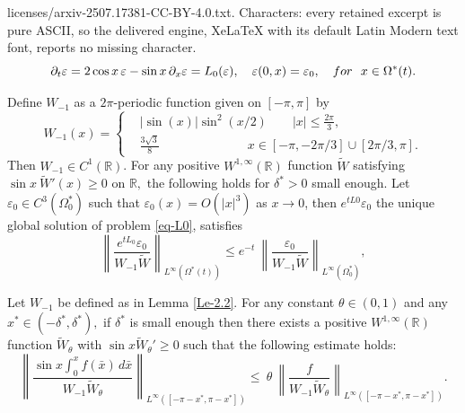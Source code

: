 \documentclass[10pt,a4paper]{amsart}
\def\R{{\mathbb R}}
\let\veps=\varepsilon
\begin{document}
licenses/arxiv-2507.17381-CC-BY-4.0.txt. Characters: every retained excerpt is pure ASCII, so the delivered engine, XeLaTeX with its default Latin Modern text font, reports no missing character.
\begin{equation}\label{eq-L0}
\partial_t \veps = 2 \cos x \,\veps-\sin x\, \partial_x \veps=L_0 (\veps), \quad \veps(0, x)=\veps_0,\quad {\rm for}~~x\in \Omega^*(t).
 \end{equation}

 \begin{lem}\label{Le-2.2}
 Define $W_{-1}$ as a $2\pi$-periodic function given on $[-\pi, \pi]$ by 
\begin{equation}
{W}_{-1} (x)=\left\{\begin{aligned}
 &|\sin(x) |\sin^2(x/2)\qquad |x|\leq \frac{2\pi}{3},\\
 &\frac{3\sqrt{3}}{8}\qquad\qquad\qquad \quad  x\in [-\pi, - {2\pi}/{3}]\cup [{2\pi}/{3},  \pi].
 \end{aligned}\right.
\end{equation}
Then $W_{-1}\in C^1(\mathbb R)$. For any positive  $W^{1, \infty}(\R)$  function $\widetilde W$ satisfying $\sin x ~{\widetilde W}'(x)\geq 0$ on $\R,$ the 
following holds for $\delta^*>0$ small enough. Let $\veps_0\in  C^{3}(\Omega^*_0)$ such that $\veps_0(x)=O(|x|^{3})$ as $x\to 0$, then $e^{tL0}\veps_0$ the unique global solution of problem \eqref{eq-L0}, satisfies 
\begin{equation}\label{Le2.2-2}
\left\|\frac{e^{tL_0} \veps_0}{W_{-1} \widetilde W}\right\|_{L^\infty{(\Omega^*(t))}}\leq  e^{-t}~
 \left\|\frac{\veps_0}{W_{-1}\widetilde W}\right\|_{L^\infty{(\Omega^*_0)}},\end{equation}
  \end{lem}

 \begin{lem}\label{Le-2.3}
 Let $W_{-1}$ be defined as in Lemma \ref{Le-2.2}.     For any   constant $\theta\in(0, 1)$ and  any  $x^*  \in (-\delta^*, \delta^*),$    if   $\delta^*$ is small enough  then  there exists a positive $W^{1, \infty}(\mathbb R)$ function  $\widetilde{W}_\theta$ with $\sin x \widetilde{W}_\theta'\geq 0$ such that   the following estimate holds:    
\begin{equation}\label{lemeq-3.3}
\left\| \frac{\sin x \int_0^x f(\bar x)\,d\bar x}{W_{-1}\widetilde W_\theta}\right\|_{L^\infty( [-\pi-x^*, \pi-x^*])}\leq ~\theta ~\left\|\frac{f}{W_{-1}\widetilde W_\theta}\right\|_{L^\infty([-\pi-x^*, \pi-x^*])}.
 \end{equation}
 \end{lem}
\end{document}
